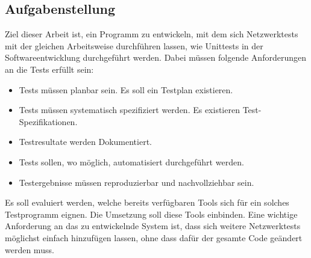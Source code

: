 \documentclass[]{subfiles}
\begin{document}
    \subsection{Aufgabenstellung}
    \label{subsec:Aufgabenstellung}
    Ziel dieser Arbeit ist, ein Programm zu entwickeln, mit dem sich Netzwerktests mit 
    der gleichen Arbeitsweise durchführen lassen, wie Unittests in der Softwareentwicklung
    durchgeführt werden. Dabei müssen folgende Anforderungen an die Tests erfüllt sein:
    \begin{itemize}
        \item Tests müssen planbar sein. Es soll ein Testplan existieren.
        \item Tests müssen systematisch spezifiziert werden. Es existieren Test-Spezifikationen.
        \item Testresultate werden Dokumentiert.
        \item Tests sollen, wo möglich, automatisiert durchgeführt werden.
        \item Testergebnisse müssen reproduzierbar und nachvollziehbar sein.
    \end{itemize}
    Es soll evaluiert werden, welche bereits verfügbaren Tools sich für ein solches Testprogramm
    eignen. Die Umsetzung soll diese Tools einbinden.
    Eine wichtige Anforderung an das zu entwickelnde System ist, dass sich weitere 
    Netzwerktests möglichst einfach hinzufügen lassen, ohne dass dafür der gesamte Code
    geändert werden muss. 
    
\end{document}

